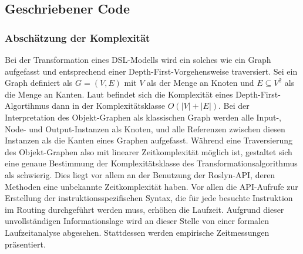 \subsection{Geschriebener Code}

\subsubsection{Abschätzung der Komplexität}
\label{subsubsec:Abschaetzung der Komplexitaet}
Bei der Transformation eines DSL-Modells wird ein solches wie ein Graph aufgefasst und entsprechend einer Depth-First-Vorgehensweise traversiert. Sei ein Graph definiert als $G = (V, E)$ mit $V$ als der Menge an Knoten und $E \subseteq V^{2}$ als die Menge an Kanten. Laut \cite[S. 479]{Cormen:90} befindet sich die Komplexität eines Depth-First-Algortihmus dann in der Komplexitätsklasse $O(\left\vert{V}\right\vert + \left\vert{E}\right\vert)$. Bei der Interpretation des Objekt-Graphen als klassischen Graph werden alle Input-, Node- und Output-Instanzen als Knoten, und alle Referenzen zwischen diesen Instanzen als die Kanten eines Graphen aufgefasst. Während eine Traversierung des Objekt-Graphen also mit linearer Zeitkomplexität möglich ist, gestaltet sich eine genaue Bestimmung der Komplexitätsklasse des Transformationsalgorithmus als schwierig. Dies liegt vor allem an der Benutzung der Roslyn-API, deren Methoden eine unbekannte Zeitkomplexität haben. Vor allen die API-Aufrufe zur Erstellung der instruktionsspezifischen Syntax, die für jede besuchte Instruktion im Routing durchgeführt werden muss, erhöhen die Laufzeit.
\newline
Aufgrund dieser unvollständigen Informationslage wird an dieser Stelle von einer formalen Laufzeitanalyse abgesehen. Stattdessen werden empirische Zeitmessungen präsentiert.


